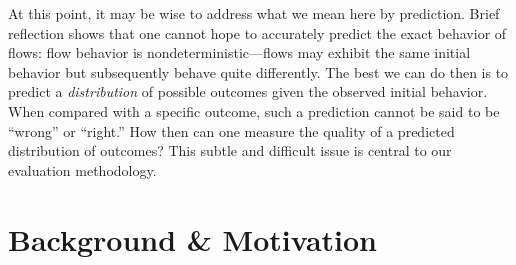 \documentclass[conference]{IEEEtran}
\begin{document}
At this point, it may be wise to address what we mean here by prediction.
Brief reflection shows that one cannot hope to accurately predict the exact behavior of flows:
flow behavior is nondeterministic---flows may exhibit the same initial behavior but subsequently behave quite differently.
The best we can do then is to predict a \emph{distribution} of possible outcomes given the observed initial behavior.
When compared with a specific outcome, such a prediction cannot be said to be ``wrong'' or ``right.''
How then can one measure the quality of a predicted distribution of outcomes?
This subtle and difficult issue is central to our evaluation methodology.




\section{Background \& Motivation}
\end{document}

